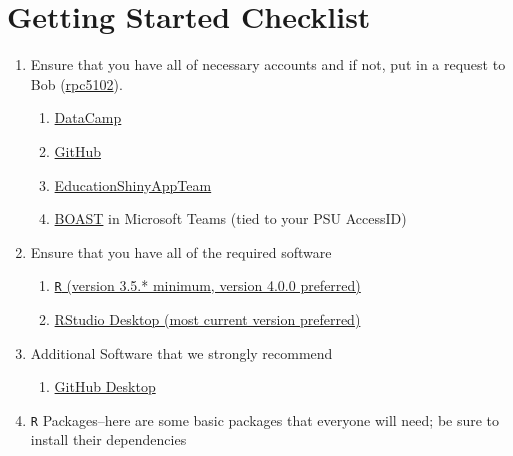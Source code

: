 \documentclass[
]{book}
\providecommand{\tightlist}{%
  \setlength{\itemsep}{0pt}\setlength{\parskip}{0pt}}
\begin{document}
\hypertarget{checklist}{%
\section{Getting Started Checklist}\label{checklist}}

\begin{enumerate}
\def\labelenumi{\arabic{enumi}.}
\item
  Ensure that you have all of necessary accounts and if not, put in a request to Bob (\href{mailto:rpc5102@psu.edu}{rpc5102}).

  \begin{enumerate}
  \def\labelenumii{\alph{enumii}.}
  \tightlist
  \item
    \href{https://www.datacamp.com/}{DataCamp}\\
  \item
    \href{https://github.com/}{GitHub}\\
  \item
    \href{https://github.com/EducationShinyAppTeam}{EducationShinyAppTeam}
  \item
    \href{https://teams.microsoft.com/l/team/19\%3a8423bc25992a4451952d8312b497324d\%40thread.skype/conversations?groupId=a83c9d1b-6bcc-46f4-aa25-82b2fad862ec\&tenantId=7cf48d45-3ddb-4389-a9c1-c115526eb52e}{BOAST} in Microsoft Teams (tied to your PSU AccessID)
  \end{enumerate}
\item
  Ensure that you have all of the required software

  \begin{enumerate}
  \def\labelenumii{\alph{enumii}.}
  \tightlist
  \item
    \href{https://cloud.r-project.org/}{\texttt{R} (version 3.5.* minimum, version 4.0.0 preferred)}
  \item
    \href{https://rstudio.com/products/rstudio/download/\#download}{RStudio Desktop (most current version preferred)}
  \end{enumerate}
\item
  Additional Software that we strongly recommend

  \begin{enumerate}
  \def\labelenumii{\alph{enumii}.}
  \tightlist
  \item
    \href{https://desktop.github.com/}{GitHub Desktop}
  \end{enumerate}
\item
  \texttt{R} Packages--here are some basic packages that everyone will need; be sure to install their dependencies


\end{enumerate}
\end{document}
